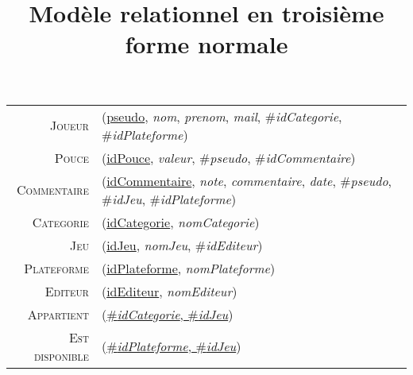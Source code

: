 \documentclass{article}
\title{Modèle relationnel en troisième forme normale}
\newenvironment{mld}
{\par\begin{minipage}{\linewidth}\begin{tabular}{rp{\linewidth}}}
{\end{tabular}\end{minipage}\par}
\newcommand{\relat}[1]{\textsc{#1}}
\newcommand{\attr}[1]{\emph{#1}}
\newcommand{\prim}[1]{\uline{#1}}
\newcommand{\foreign}[1]{\#\textsl{#1}}
\begin{document}
\maketitle{}

\begin{mld}
  \relat{Joueur} & (\prim{pseudo}, \attr{nom}, \attr{prenom}, \attr{mail}, \foreign{idCategorie}, \foreign{idPlateforme})\\
  \relat{Pouce} & (\prim{idPouce}, \attr{valeur}, \foreign{pseudo}, \foreign{idCommentaire})\\
  \relat{Commentaire} & (\prim{idCommentaire}, \attr{note}, \attr{commentaire}, \attr{date}, \foreign{pseudo}, \foreign{idJeu}, \foreign{idPlateforme})\\
  \relat{Categorie} & (\prim{idCategorie}, \attr{nomCategorie})\\
  \relat{Jeu} & (\prim{idJeu}, \attr{nomJeu}, \foreign{idEditeur})\\
  \relat{Plateforme} & (\prim{idPlateforme}, \attr{nomPlateforme})\\
  \relat{Editeur} & (\prim{idEditeur}, \attr{nomEditeur})\\
  \relat{Appartient} & (\prim{\foreign{idCategorie}, \foreign{idJeu}})\\
  \relat{Est disponible} & (\prim{\foreign{idPlateforme}, \foreign{idJeu}})\\
\end{mld}
\end{document}
